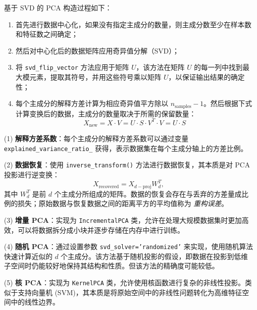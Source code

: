 \begin{theorem}{基于 SVD 的 PCA 构造过程如下：}

\begin{enumerate}
  \item 首先进行数据中心化，如果没有指定主成分的数量，则主成分数至少在样本数和特征数之间确定；
  \item 然后对中心化后的数据矩阵应用奇异值分解（SVD）；
  \item 将 \texttt{svd\_flip\_vector} 方法应用于矩阵 $U$，该方法在矩阵 $U$ 的每一列中找到最大模元素，提取其符号，并用这些符号乘以矩阵 $U$，以保证输出结果的确定性；
  \item 每个主成分的解释方差计算为相应奇异值平方除以 $n_{\text{samples}} - 1$。然后根据下式计算变换后的数据，主成分的数量取决于所需的保留数量：
  \[
    X_{\text{new}} = X \cdot V = U \cdot S \cdot V^T \cdot V = U \cdot S
  \]
\end{enumerate}
\end{theorem}
\begin{theorem}
\quad

(1) \textbf{解释方差系数}：每个主成分的解释方差系数可以通过变量 \texttt{explained\_variance\_ratio\_} 获得，表示数据集在每个主成分轴上的方差比例。

(2) \textbf{数据恢复}：使用 \texttt{inverse\_transform()} 方法进行数据恢复，其本质是对 PCA 投影进行逆变换：
\[
X_{\text{recovered}} = X_{d-\text{proj}} W_d^T ,
\]
其中 $W_d^T$ 是前 $d$ 个主成分所组成的矩阵。数据的恢复会存在与丢弃的方差量成比例的损失；原始数据与恢复数据之间的距离平方的平均值称为 \emph{重构误差}。

(3) \textbf{增量 PCA}：实现为 \texttt{IncrementalPCA} 类，允许在处理大规模数据集时更加高效，可以将数据拆分成小块并逐步存储在内存中进行训练。

(4) \textbf{随机 PCA}：通过设置参数 \texttt{svd\_solver='randomized'} 来实现，使用随机算法快速计算近似的 $d$ 个主成分。该方法基于随机投影的假设，即数据在投影到低维子空间时仍能较好地保持其结构和性质。但该方法的精确度可能较低。

(5) \textbf{核 PCA}：实现为 \texttt{KernelPCA} 类，允许使用核函数进行复杂的非线性投影。类似于支持向量机 (SVM)，其本质是将原始空间中的非线性问题转化为高维特征空间中的线性边界。
\end{theorem}

